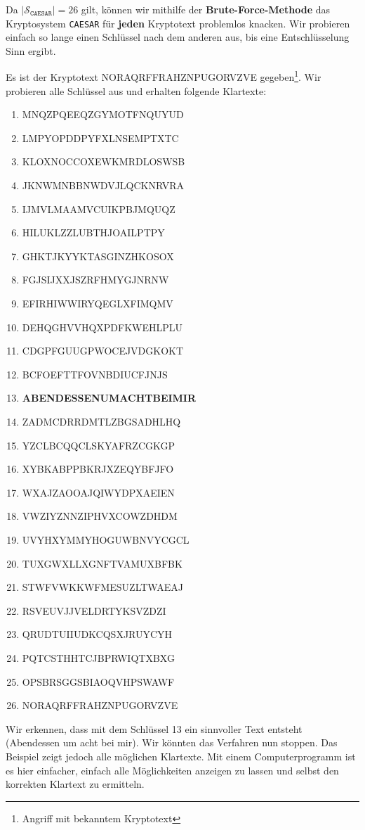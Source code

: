 Da $|\mathscr{S}_{\texttt{CAESAR}}| = 26$ gilt, können wir mithilfe der \textbf{Brute-Force-Methode} das Kryptosystem \texttt{CAESAR} für \textbf{jeden} Kryptotext problemlos knacken. Wir probieren einfach so lange einen Schlüssel nach dem anderen aus, bis eine Entschlüsselung Sinn ergibt.

\newpage

\begin{example}
Es ist der Kryptotext NORAQRFFRAHZNPUGORVZVE gegeben\footnote{Angriff mit bekanntem Kryptotext}. Wir probieren alle Schlüssel aus und erhalten folgende Klartexte:

\begin{multicols}{2}
\begin{enumerate}
\item MNQZPQEEQZGYMOTFNQUYUD
\item LMPYOPDDPYFXLNSEMPTXTC
\item KLOXNOCCOXEWKMRDLOSWSB
\item JKNWMNBBNWDVJLQCKNRVRA
\item IJMVLMAAMVCUIKPBJMQUQZ
\item HILUKLZZLUBTHJOAILPTPY
\item GHKTJKYYKTASGINZHKOSOX
\item FGJSIJXXJSZRFHMYGJNRNW
\item EFIRHIWWIRYQEGLXFIMQMV
\item DEHQGHVVHQXPDFKWEHLPLU
\item CDGPFGUUGPWOCEJVDGKOKT
\item BCFOEFTTFOVNBDIUCFJNJS
\item \textbf{ABENDESSENUMACHTBEIMIR}
\item ZADMCDRRDMTLZBGSADHLHQ
\item YZCLBCQQCLSKYAFRZCGKGP
\item XYBKABPPBKRJXZEQYBFJFO
\item WXAJZAOOAJQIWYDPXAEIEN
\item VWZIYZNNZIPHVXCOWZDHDM
\item UVYHXYMMYHOGUWBNVYCGCL
\item TUXGWXLLXGNFTVAMUXBFBK
\item STWFVWKKWFMESUZLTWAEAJ
\item RSVEUVJJVELDRTYKSVZDZI
\item QRUDTUIIUDKCQSXJRUYCYH
\item PQTCSTHHTCJBPRWIQTXBXG
\item OPSBRSGGSBIAOQVHPSWAWF
\item NORAQRFFRAHZNPUGORVZVE
\end{enumerate}
\end{multicols}

Wir erkennen, dass mit dem Schlüssel \num{13} ein sinnvoller Text entsteht (Abendessen um acht bei mir). Wir könnten das Verfahren nun stoppen. Das Beispiel zeigt jedoch alle möglichen Klartexte. Mit einem Computerprogramm ist es hier einfacher, einfach alle Möglichkeiten anzeigen zu lassen und selbst den korrekten Klartext zu ermitteln.
\end{example}

